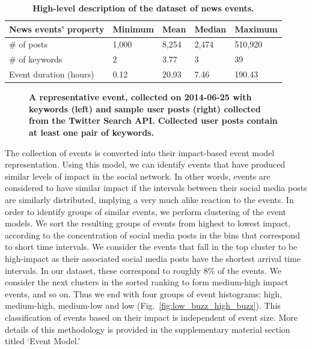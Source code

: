 \documentclass[10pt,letterpaper]{article}
\begin{document}
\begin{table}
  \centering
  \begin{tabularx}{\textwidth}{@{}p{6cm}llll@{}}
    \toprule
    \textbf{News events' property} & \textbf{Minimum} & \textbf{Mean} & \textbf{Median} & \textbf{Maximum} \\ \midrule
    \# of posts & 1,000 & 8,254 & 2,474 & 510,920 \\
    \# of keywords & 2 & 3.77 & 3 & 39 \\
    Event duration (hours) & 0.12 & 20.93 & 7.46 & 190.43 \\ \bottomrule
  \end{tabularx}
  \caption{\bf High-level description of the dataset of news events.} \label{table:dataset-stats}
\end{table}

\begin{figure}
  \caption{\textbf{A representative event, collected on 2014-06-25
      with keywords (left) and sample user posts (right) collected
      from the Twitter Search API. Collected user posts contain at
      least one pair of keywords. }}
  \label{fig:components}
\end{figure}


The collection of events is converted into their impact-based event
model representation. Using this model, we can identify events that
have produced similar levels of impact in the social network. In other
words, events are considered to have similar impact if the intervals
between their social media posts are similarly distributed, implying a
very much alike reaction to the events. In order to identify groups of
similar events, we perform clustering of the event models. We sort the
resulting groups of events from highest to lowest impact, according to
the concentration of social media posts in the bins that correspond to
short time intervals. We consider the events that fall in the top
cluster to be high-impact as their associated social media posts have
the shortest arrival time intervals.  In our dataset, these correspond
to roughly 8\% of the events.  We consider the next clusters in the
sorted ranking to form medium-high impact events, and so on.  Thus we
end with four groups of event histograms: high, medium-high,
medium-low and low (Fig.~\ref{fig:low_buzz_high_buzz}). This
classification of events based on their impact is independent of event
size. More details of this methodology is provided in the
supplementary material section titled `Event Model.'
\end{document}
